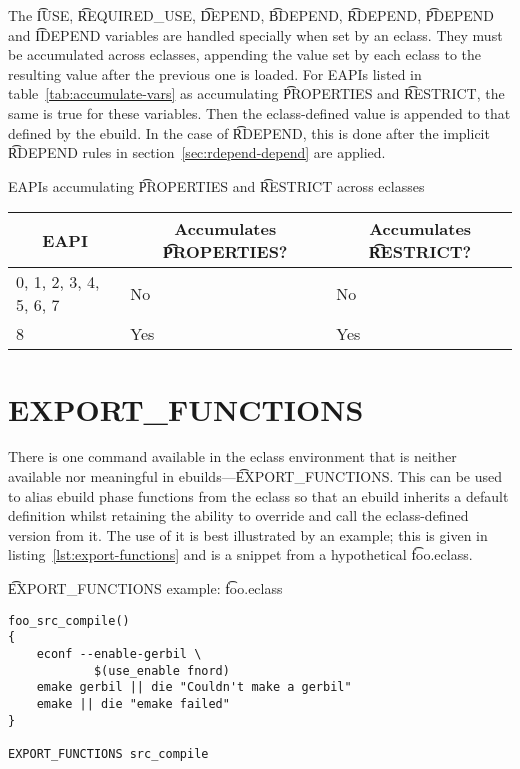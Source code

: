 The \t{IUSE}, \t{REQUIRED_USE}, \t{DEPEND}, \t{BDEPEND}, \t{RDEPEND},
\t{PDEPEND} and \t{IDEPEND} variables are handled specially when set by an eclass. They must be
accumulated across eclasses, appending the value set by each eclass to the resulting value after
the previous one is loaded. For EAPIs listed in table~\ref{tab:accumulate-vars} as accumulating
\t{PROPERTIES} and \t{RESTRICT}, the same is true for these variables. Then the eclass-defined
value is appended to that defined by the ebuild. In the case of \t{RDEPEND}, this is done after
the implicit \t{RDEPEND} rules in section~\ref{sec:rdepend-depend} are applied.

\begin{centertable}{EAPIs accumulating \t{PROPERTIES} and \t{RESTRICT} across eclasses}
    \label{tab:accumulate-vars}
    \begin{tabular}{lll}
      \toprule
      \multicolumn{1}{c}{\textbf{EAPI}} &
      \multicolumn{1}{c}{\textbf{Accumulates \t{PROPERTIES}?}} &
      \multicolumn{1}{c}{\textbf{Accumulates \t{RESTRICT}?}} \\
      \midrule
      0, 1, 2, 3, 4, 5, 6, 7  & No  & No  \\
      8                       & Yes & Yes \\
      \bottomrule
    \end{tabular}
\end{centertable}

\section{EXPORT_FUNCTIONS}

There is one command available in the eclass environment that is neither available nor meaningful
in ebuilds---\t{EXPORT_FUNCTIONS}\@. This can be used to alias ebuild phase functions from the
eclass so that an ebuild inherits a default definition whilst retaining the ability to override and
call the eclass-defined version from it. The use of it is best illustrated by an example; this is
given in listing~\ref{lst:export-functions} and is a snippet from a hypothetical \t{foo.eclass}.

\begin{listing}
\caption{\t{EXPORT_FUNCTIONS} example: \t{foo.eclass}} \label{lst:export-functions}
\begin{verbatim}
foo_src_compile()
{
    econf --enable-gerbil \
            $(use_enable fnord)
    emake gerbil || die "Couldn't make a gerbil"
    emake || die "emake failed"
}

EXPORT_FUNCTIONS src_compile
\end{verbatim}
\end{listing}

